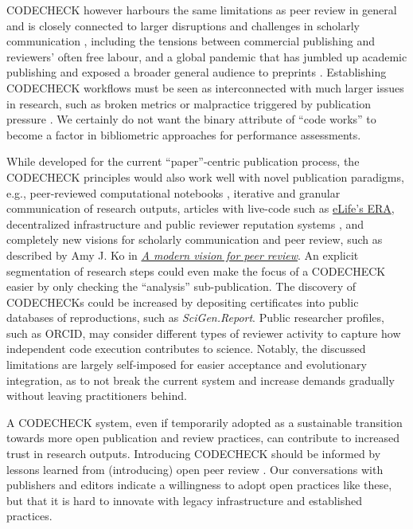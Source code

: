 \documentclass[12pt]{article}
\begin{document}
CODECHECK however harbours the same limitations as peer review in
general and is closely connected to larger disruptions and challenges
in scholarly communication
\cite{eglen_recent_2018,tennant_ten_2019,fyfe_mission_2019}, including
the tensions between commercial publishing and reviewers' often free
labour, and a global pandemic that has jumbled up academic
publishing and exposed a broader general audience to preprints
\cite{munafo_what_2020}.  Establishing CODECHECK
workflows must be seen as interconnected with much larger issues in
research, such as broken metrics or malpractice triggered by
publication pressure
\cite{piwowar_altmetrics:_2013,nosek_promoting_2015}.  We certainly do
not want the binary attribute of ``code works'' to become a factor in
bibliometric approaches for performance assessments.

While developed for the current ``paper''-centric publication process,
the CODECHECK principles would also work well with novel publication
paradigms, e.g., peer-reviewed computational notebooks
\cite{earthcube_new_2020}, iterative and granular communication of
research outputs, articles with live-code
\cite{perkel_pioneering_2019-1} such as \href{https://elifesciences.org/labs/dc5acbde/welcome-to-a-new-era-of-reproducible-publishing}{eLife's ERA},
decentralized infrastructure and public reviewer reputation systems
\cite{tenorio-fornes_towards_2019}, and completely new visions for
scholarly communication and peer review, such as described by Amy J. Ko
in \href{https://medium.com/bits-and-behavior/a-modern-vision-for-peer-review-d5f73f0fae07}{\emph{A modern vision for peer review}}.
An explicit segmentation of research steps could even make the focus
of a CODECHECK easier by only checking the ``analysis''
sub-publication.  The discovery of CODECHECKs could be increased by
depositing certificates into public databases of reproductions, such as
\emph{SciGen.Report}.  Public researcher profiles, such as ORCID, may
consider different types of reviewer activity to capture how
independent code execution contributes to science.  Notably, the
discussed limitations are largely self-imposed for easier acceptance
and evolutionary integration, as to not break the current system and
increase demands gradually without leaving practitioners behind.

A CODECHECK system, even if temporarily adopted as a sustainable
transition towards more open publication and review practices, can
contribute to increased trust in research outputs. Introducing
CODECHECK should be informed by lessons learned from (introducing)
open peer review \cite{ross-hellauer_guidelines_2019}.  Our
conversations with publishers and editors indicate a willingness to
adopt open practices like these, but that it is hard to innovate with
legacy infrastructure and established practices.
\end{document}
